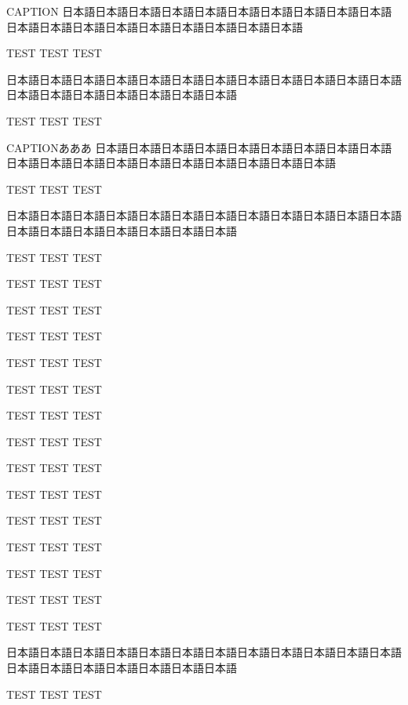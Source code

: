 \begin{rv@squarebox@caption}{CAPTION}
日本語日本語日本語日本語日本語日本語日本語日本語日本語日本語日本語日本語日本語日本語日本語日本語日本語日本語日本語

TEST TEST TEST

\end{rv@squarebox@caption}

\clearpage

\begin{rv@marker@nocaption}[rv marker markchar={?}, rv marker markcolback=red, rv marker markcoltext=blue]
日本語日本語日本語日本語日本語日本語日本語日本語日本語日本語日本語日本語日本語日本語日本語日本語日本語日本語日本語

TEST TEST TEST

\end{rv@marker@nocaption}

\begin{rv@marker@caption}{CAPTIONあああ}
日本語日本語日本語日本語日本語日本語日本語日本語日本語日本語日本語日本語日本語日本語日本語日本語日本語日本語日本語

TEST TEST TEST

\end{rv@marker@caption}

\begin{rv@marker@nocaption}[rv marker markchar={?}]
日本語日本語日本語日本語日本語日本語日本語日本語日本語日本語日本語日本語日本語日本語日本語日本語日本語日本語日本語

TEST TEST TEST

TEST TEST TEST

TEST TEST TEST

TEST TEST TEST

TEST TEST TEST

TEST TEST TEST

TEST TEST TEST

TEST TEST TEST

TEST TEST TEST

TEST TEST TEST

TEST TEST TEST

TEST TEST TEST

TEST TEST TEST

TEST TEST TEST

TEST TEST TEST

\end{rv@marker@nocaption}

\clearpage

\begin{rv@outerarcbox@nocaption}
日本語日本語日本語日本語日本語日本語日本語日本語日本語日本語日本語日本語日本語日本語日本語日本語日本語日本語日本語

TEST TEST TEST

\end{rv@outerarcbox@nocaption}

